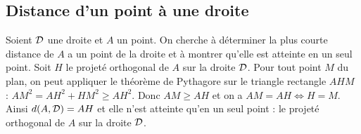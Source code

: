 \subsection{Distance d'un point à une droite}

Soient $\mathcal{D}$ une droite et $A$ un point. On cherche à déterminer la plus courte distance de $A$ a un point de la droite et à montrer qu'elle est atteinte en un seul point. Soit $H$ le projeté orthogonal de $A$ sur la droite $\mathcal{D}$. Pour tout point $M$ du plan, on peut appliquer le théorème de Pythagore sur le triangle rectangle $AHM$ : $AM^2=AH^2+HM^2 \geqslant AH^2$. Donc $AM \geqslant AH$ et on a $AM=AH \iff H=M$. Ainsi $d(A,\mathcal{D})=AH$ et elle n'est atteinte qu'en un seul point : le projeté orthogonal de $A$ sur la droite $\mathcal{D}$.%

